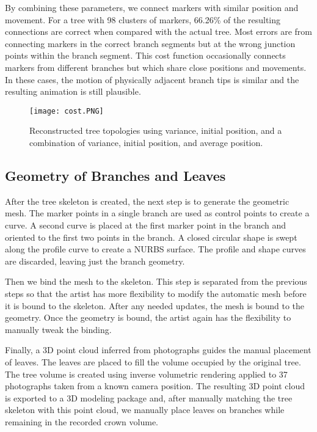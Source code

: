 By combining these parameters, we connect markers with similar position and movement. For a tree with 98 clusters of markers, 66.26\% of the resulting connections are correct when compared with the actual tree. Most errors are from connecting markers in the correct branch segments but at the wrong junction points within the branch segment.   This cost function occasionally connects markers from different branches but which share close positions and movements.  In these cases, the motion of physically adjacent branch tips is similar and the resulting animation is still plausible.  

\begin{figure*}[tb]
\centering
\texttt{[image: cost.PNG]}
\caption[Reconstructed tree topologies.]{Reconstructed tree topologies using variance, initial position, and a combination of variance, initial position, and average position.}
\label{fig:costResults} 
\end{figure*}

\subsection{Geometry of Branches and Leaves}

After the tree skeleton is created, the next step is to generate the geometric mesh. The marker points in a single branch are used as control points to create a curve. A second curve is placed at the first marker point in the branch and oriented to the first two points in the branch.  A closed circular shape is swept along the profile curve to create a NURBS surface. The profile and shape curves are discarded, leaving just the branch geometry.

Then we bind the mesh to the skeleton.  This step is separated from the previous steps so that the artist has more flexibility to modify the automatic mesh before it is bound to the skeleton. After any needed updates, the mesh is bound to the geometry. Once the geometry is bound, the artist again has the flexibility to manually tweak the binding.

Finally, a 3D point cloud inferred from photographs guides the manual placement of leaves. The leaves are placed to fill the volume occupied by the original tree. The tree volume is created using inverse volumetric rendering \cite{RecheMartinez2004} applied to 37 photographs taken from a known camera position. The resulting 3D point cloud is exported to a 3D modeling package and, after manually matching the tree skeleton with this point cloud, we manually place leaves on branches while remaining in the recorded crown volume.


